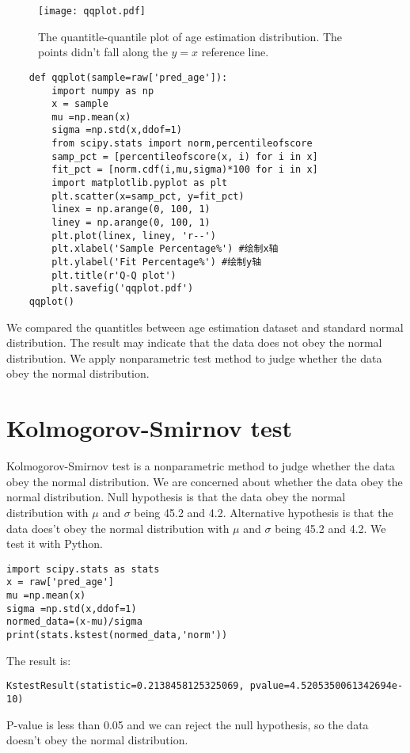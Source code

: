 \documentclass[fancy,11pt,twocol]{elegantbook}
\begin{document}
\begin{figure}[htbp]
	\centering
	\texttt{[image: qqplot.pdf]}
	\caption{The quantitle-quantile plot of age estimation distribution. The points didn't fall along the $y=x$ reference line. }
\end{figure}

\begin{lstlisting}
	def qqplot(sample=raw['pred_age']):
		import numpy as np
		x = sample
		mu =np.mean(x)
		sigma =np.std(x,ddof=1)
		from scipy.stats import norm,percentileofscore
		samp_pct = [percentileofscore(x, i) for i in x]
		fit_pct = [norm.cdf(i,mu,sigma)*100 for i in x]
		import matplotlib.pyplot as plt
		plt.scatter(x=samp_pct, y=fit_pct)
		linex = np.arange(0, 100, 1)
		liney = np.arange(0, 100, 1)
		plt.plot(linex, liney, 'r--')
		plt.xlabel('Sample Percentage%') #绘制x轴 
		plt.ylabel('Fit Percentage%') #绘制y轴 
		plt.title(r'Q-Q plot')
		plt.savefig('qqplot.pdf')
	qqplot()
\end{lstlisting}

We compared the quantitles between age estimation dataset and standard normal distribution. The result may indicate that the data does not obey the normal distribution. We apply nonparametric test method to judge whether the data obey the normal distribution.





\section{Kolmogorov-Smirnov test}
Kolmogorov-Smirnov test is a nonparametric method to judge whether the data obey the normal distribution.
We are concerned about whether the data obey the normal distribution. Null hypothesis is that the data obey the normal distribution with $\mu$ and $\sigma$ being 45.2 and 4.2. Alternative hypothesis is that the data does't obey the normal distribution with $\mu$ and $\sigma$ being 45.2 and 4.2.
We test it with Python.

\begin{lstlisting}
import scipy.stats as stats
x = raw['pred_age']
mu =np.mean(x)
sigma =np.std(x,ddof=1)
normed_data=(x-mu)/sigma
print(stats.kstest(normed_data,'norm'))
\end{lstlisting}

The result is:
\begin{lstlisting}
KstestResult(statistic=0.2138458125325069, pvalue=4.5205350061342694e-10)
\end{lstlisting}
P-value is less than 0.05 and we can reject the null hypothesis, so the data doesn't obey the normal distribution.
\end{document}
